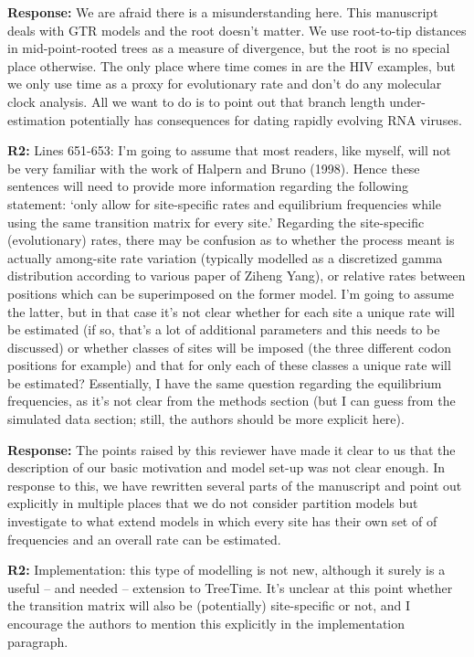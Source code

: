 \documentclass[aps,rmp,onecolumn]{revtex4-1}
\newcommand{\refb}[1]{\textbf{R2:} #1}
\newcommand{\response}[1]{{\color{black}\textbf{Response:} #1}}
\begin{document}
\response{
We are afraid there is a misunderstanding here.
This manuscript deals with GTR models and the root doesn't matter.
We use root-to-tip distances in mid-point-rooted trees as a measure of divergence, but the root is no special place otherwise.
The only place where time comes in are the HIV examples, but we only use time as a proxy for evolutionary rate and don't do any molecular clock analysis.
All we want to do is to point out that branch length under-estimation potentially has consequences for dating rapidly evolving RNA viruses.}


\refb{Lines 651-653: I’m going to assume that most readers, like myself, will not be very familiar with the work of Halpern and Bruno (1998). Hence these sentences will need to provide more information regarding the following statement: ‘only allow for site-specific rates and equilibrium frequencies while using the same transition matrix for every site.’ Regarding the site-specific (evolutionary) rates, there may be confusion as to whether the process meant is actually among-site rate variation (typically modelled as a discretized gamma distribution according to various paper of Ziheng Yang), or relative rates between positions which can be superimposed on the former model. I’m going to assume the latter, but in that case it’s not clear whether for each site a unique rate will be estimated (if so, that’s a lot of additional parameters and this needs to be discussed) or whether classes of sites will be imposed (the three different codon positions for example) and that for only each of these classes a unique rate will be estimated? Essentially, I have the same question regarding the equilibrium frequencies, as it’s not clear from the methods section (but I can guess from the simulated data section; still, the authors should be more explicit here).}

\response{
The points raised by this reviewer have made it clear to us that the description of our basic motivation and model set-up was not clear enough. In response to this, we have rewritten several parts of the manuscript and point out explicitly in multiple places that we do not consider partition models but investigate to what extend models in which every site has their own set of of frequencies and an overall rate can be estimated. }


\refb{Implementation: this type of modelling is not new, although it surely is a useful -- and needed -- extension to TreeTime. It’s unclear at this point whether the transition matrix will also be (potentially) site-specific or not, and I encourage the authors to mention this explicitly in the implementation paragraph.}
\end{document}
